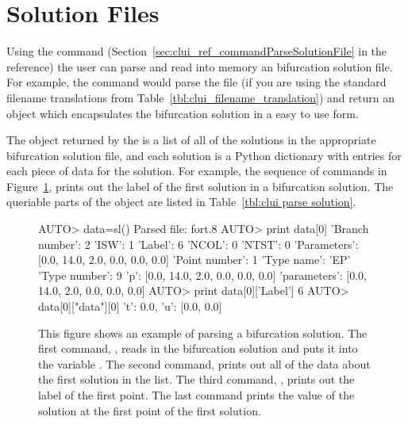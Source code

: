 \documentclass[12pt]{report}
\begin{document}
 \section{Solution Files}
 Using the  
 command (Section~\ref{sec:clui_ref_commandParseSolutionFile} in the reference)
 the user can parse and read into memory an \AUTO bifurcation
 solution file.   For example, the command  
 would parse the file  (if you are using the standard
 filename translations from Table~\ref{tbl:clui_filename_translation})
 and return an object which encapsulates
 the bifurcation solution in a easy to use form.

 The object returned by the  
 is a list of all of the solutions in the appropriate
 bifurcation solution file, and each solution is a Python
 dictionary with entries for each  piece of
 data for the solution.  For example, the sequence of commands
 in Figure~\ref{exa:clui parse solution}, prints out the
 label of the first solution in a bifurcation solution.
 The queriable parts of the object are listed in
 Table~\ref{tbl:clui parse solution}.

 \begin{figure}[htbp]
 {\small \begin{center} \begin{boxedverbatim}
 AUTO> data=sl()
 Parsed file: fort.8
 AUTO> print data[0]
 'Branch number': 2
 'ISW': 1
 'Label': 6
 'NCOL': 0
 'NTST': 0
 'Parameters': [0.0, 14.0, 2.0, 0.0, 0.0, 0.0]
 'Point number': 1
 'Type name': 'EP'
 'Type number': 9
 'p': [0.0, 14.0, 2.0, 0.0, 0.0, 0.0]
 'parameters': [0.0, 14.0, 2.0, 0.0, 0.0, 0.0]
 AUTO> print data[0]['Label']
 6
 AUTO> data[0]["data"][0]
 {'t': 0.0, 'u': [0.0, 0.0]}
 \end{boxedverbatim}
 \end{center} 
 }
 \caption[An example of parsing a bifurcation solution.]
 {This figure shows an example of parsing a bifurcation solution.
 The first command, , reads in the bifurcation
 solution and puts it into the variable .
 The second command,  prints out all of
 the data about the first solution in the list.
 The third command, , prints
 out the label of the first point.  The last command prints
 the value of the solution at the first point of the
 first solution.
 }
 \label{exa:clui parse solution}
 \end{figure}
\end{document}
